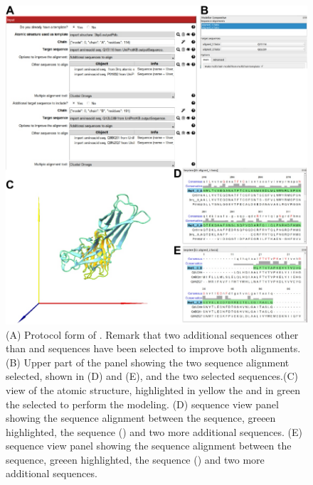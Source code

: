 \begin{itemize}
 
                            \begin{figure}[H]
                            \centering 
                            \captionsetup{width=.8\linewidth} 
                            \includegraphics[width=.9\textwidth]{Images_appendix/Fig306.pdf}
                            \caption{(A) Protocol form of . Remark that two additional sequences other than  and  sequences have been selected to improve both alignments. (B) Upper part of the \chimera {} panel showing the two sequence alignment selected, shown in (D) and (E), and the two selected  sequences.(C) \chimera view of the  atomic structure, highlighted in yellow the  and in green the  selected to perform the modeling. (D) \chimera sequence view panel showing the sequence alignment between the   sequence, greeen highlighted, the  sequence () and two more additional sequences. (E) \chimera sequence view panel showing the sequence alignment between the   sequence, greeen highlighted, the  sequence () and two more additional sequences.}  
                            \label{fig:app_protocol_seqHomology_3}
                            \end{figure}
                            

\end{itemize}
